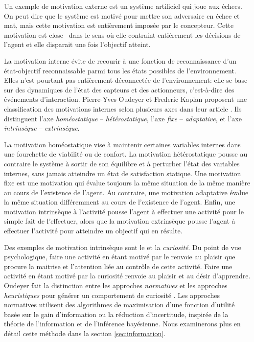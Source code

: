 Un exemple de motivation externe est un système artificiel qui joue aux échecs. 
On peut dire que le système est motivé pour mettre son adversaire en échec et mat, mais cette motivation est entièrement imposée par le concepteur. 
Cette motivation est \og close \fg\ dans le sens où elle contraint entièrement les décisions de l'agent et elle disparait une fois l'objectif atteint.

La motivation interne évite de recourir à une fonction de reconnaissance d'un  état-objectif reconnaissable parmi tous les états possibles de l'environnement.
Elles n'est pourtant pas entièrement déconnectée de l'environnement: elle se base sur des dynamiques de l'état des capteurs et des actionneurs, c'est-à-dire des événements d'interaction. 
Pierre-Yves Oudeyer et Frederic Kaplan  proposent une classification des motivations internes selon plusieurs axes dans leur article \og {} \fg \cite{oudeyer_what_2007}.
Ils distinguent l'axe \emph{homéostatique} -- \emph{hétérostatique}, l'axe \emph{fixe} -- \emph{adaptative}, et l'axe \emph{intrinsèque} -- \emph{extrinsèque}.

La motivation homéostatique vise à maintenir certaines variables internes dans une fourchette de viabilité ou de confort. 
La motivation hétérostatique pousse au contraire le système à sortir de son équilibre et à perturber l'état des variables internes, sans jamais atteindre un état de satisfaction statique. 
Une motivation fixe est une motivation qui évalue toujours la même situation de la même manière au cours de l'existence de l'agent. 
Au contraire, une motivation adaptative évalue la même situation différemment au cours de l'existence de l'agent.
Enfin, une motivation intrinsèque à l'activité pousse l'agent à effectuer une activité pour le simple fait de l'effectuer, alors que la motivation extrinsèque pousse l'agent à effectuer l'activité pour atteindre un objectif qui en résulte.

Des exemples de motivation intrinsèque sont le  et la \emph{curiosité}. 
Du point de vue psychologique, faire une activité en étant motivé par le  renvoie au plaisir que procure la maitrise et l'attention liée au contrôle de cette activité. 
Faire une activité en étant motivé par la curiosité renvoie au plaisir et au désir d'apprendre. 
Oudeyer fait la distinction entre les approches \emph{normatives} et les approches \emph{heuristiques} pour générer un comportement de curiosité \cite{oudeyer_computational_2018}.
Les approches normatives utilisent des algorithmes de maximisation d'une fonction d'utilité basée sur le gain d'information ou la réduction d'incertitude, inspirée de la théorie de l'information et de l'inférence bayésienne.
Nous examinerons plus en détail cette méthode dans la section \ref{sec:information}.


